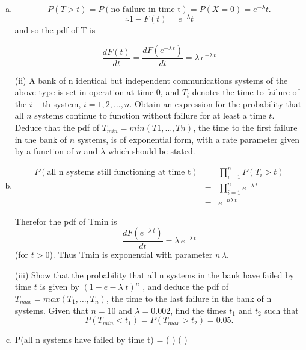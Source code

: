 \documentclass[a4paper,12pt]{article}
\begin{document}
\begin{enumerate}[(a)]
\item \[P(T > t) = P(\mbox{no failure in time t}) = P(X = 0) = e^{-\lambda} t .\]
\[\therefore 1 - F(t) = e^{-\lambda} t \] and so the pdf of T is 

\[ \frac{dF (t )}{dt}  =  \frac{dF (e^{-\lambda\,t} )}{dt}  = \lambda\,e^{-\lambda\,t}\]


\newpage
\begin{framed}
(ii) A bank of n identical but independent communications systems of the above type is set in operation at time 0, and $T_i$ denotes the time to failure of the $i-$th system, $i = 1, 2, \ldots, n$. Obtain an expression for the probability that all $n$ systems continue to function without failure for at least a time $t$. Deduce that the pdf of $T_{min} = min(T1, …, Tn)$, the time to the first failure in the bank of $n$ systems, is of exponential form, with a rate parameter given by a function of $n$ and $\lambda$ which should be stated.
\end{framed}
\item 
\begin{eqnarray*}
P(\mbox{all n systems still functioning at time t}) &=& \prod^{n}_{i=1} P(T_i > t )\\
 &=& \prod^{n}_{i=1}  e^{-\lambda\,t}\\  
 &=& e^{-n\lambda\,t} 
\end{eqnarray*} 

Therefor the pdf of Tmin is 
\[ \frac{dF (e^{-\lambda\,t} )}{dt}  = \lambda\,e^{-\lambda\,t}\] (for $t > 0$).
Thus Tmin is exponential with parameter $n\,\lambda$.

\newpage
\begin{framed}
(iii) Show that the probability that all n systems in the bank have failed by time $t$ is
given by $(1− e−\lambda\;t )^n$ , and deduce the pdf of $T_{max} = max(T_1,\ldots, T_n)$, the time to
the last failure in the bank of n systems.
Given that $n = 10$ and $\lambda = 0.002$, find the times $t_1$ and $t_2$ such that
\[P(T_{min} < t_1) = P(T_{max} > t_2) = 0.05.\]

\end{framed}
\item  P(all n systems have failed by time t) = ( ) ( )


\end{enumerate}
\end{document}
